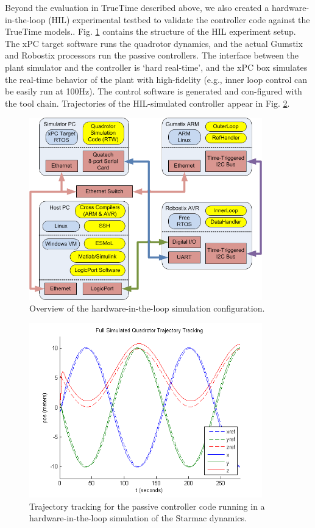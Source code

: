 Beyond the evaluation in TrueTime described above, we also created a hardware-in-the-loop (HIL) experimental testbed to validate the controller code against the TrueTime models\cite{gh_truetime,nk_qr_tr,jp_dissertation}..
Fig. \ref{fig:hil_setup} contains the structure of the HIL experiment setup.  The xPC target software runs the quadrotor dynamics, and the actual Gumstix and Robostix processors run the passive controllers.  The interface between the plant simulator and the controller is ‘hard real-time’, and the xPC box simulates the real-time behavior of the plant with high-fidelity (e.g., inner loop control can be easily run at 100Hz).  The control software is generated and con-figured with the tool chain. Trajectories of the HIL-simulated controller appear in Fig. \ref{fig:starmac_hil}.

\begin{figure}[thpb]
\centering
\includegraphics[width=0.9\textwidth]{img/hil_setup.png}
\caption{Overview of the hardware-in-the-loop simulation configuration.}
\label{fig:hil_setup}
\end{figure}


\begin{figure}[thpb]
\centering
\includegraphics[width=0.9\textwidth]{img/qr_tracking.png}
\caption{Trajectory tracking for the passive controller code running in a hardware-in-the-loop simulation of the Starmac dynamics.}
\label{fig:starmac_hil}
\end{figure}


